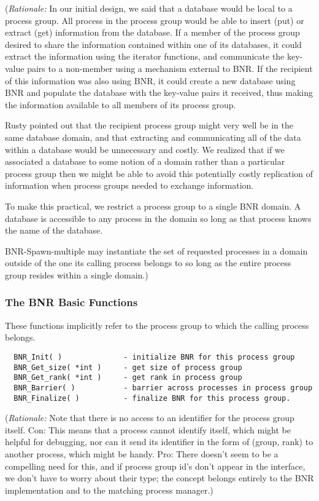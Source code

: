 \documentclass{article}
\begin{document}
({\em Rationale:\/}  In our initial design, we said that a database would be
local to a process group.  All process in the process group would be able to
insert (put) or extract (get) information from the database.  If a member of
the process group desired to share the information contained within one of its
databases, it could extract the information using the iterator functions, and
communicate the key-value pairs to a non-member using a mechanism external to
BNR.  If the recipient of this information was also using BNR, it could create
a new database using BNR and populate the database with the key-value pairs it
received, thus making the information available to all members of its process
group.

Rusty pointed out that the recipient process group might very well be in the
same database domain, and that extracting and communicating all of the data
within a database would be unnecessary and costly.  We realized that if we
associated a database to some notion of a domain rather than a particular
process group then we might be able to avoid this potentially costly
replication of information when process groups needed to exchange information.

To make this practical, we restrict a process group to a single BNR domain.  A
database is accessible to any process in the domain so long as that process
knows the name of the database.

BNR-Spawn-multiple may instantiate the set of requested processes in a domain
outside of the one its calling process belongs to so long as the entire process
group resides within a single domain.)


\subsubsection{The BNR Basic Functions}
\label{sec:bnr-basic}

These functions implicitly refer to the process group to which the calling
process belongs. 

\begin{verbatim}
  BNR_Init( )              - initialize BNR for this process group         
  BNR_Get_size( *int )     - get size of process group
  BNR_Get_rank( *int )     - get rank in process group
  BNR_Barrier( )           - barrier across processes in process group
  BNR_Finalize( )          - finalize BNR for this process group.
\end{verbatim}

({\em Rationale:\/}  Note that there is no access to an identifier for the
process group itself.  Con:  This means that a process cannot identify itself,
which might be helpful for debugging, nor can it send its identifier in the
form of (group, rank) to another process, which might be handy.  Pro:  There
doesn't seem to be a compelling need for this, and if process group id's don't
appear in the interface, we don't have to worry about their type;  the concept
belongs entirely to the BNR implementation and to the matching process
manager.) 
\end{document}
